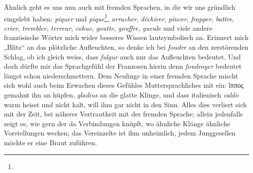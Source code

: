 {\label{fp.218}

Ähnlich geht es uns nun auch mit fremden Sprachen, in die wir uns gründlich eingelebt haben: \textit{piquer} und \textit{pique}\footnote{},  \textit{arracher}, \textit{déchirer}, \textit{pincer}, \textit{frapper}, \textit{battre}, \textit{crier}, \textit{trembler}, \textit{terreur}, \textit{cohue}, \textit{goutte}, \textit{gouffre}, \textit{gueule} und viele andere französische Wörter  mich wider besseres Wissen lautsymbolisch an. Erinnert mich „Blitz“ an das plötzliche Aufleuchten, so denke ich bei \textit{foudre} an den zerstörenden Schlag, ob ich gleich weiss, dass \textit{fulgur} auch nur das Aufleuchten bedeutet. Und doch dürfte mir das Sprachgefühl der Franzosen hierin  denn \textit{foudroyer} bedeutet längst schon niederschmettern. Dem Neulinge in einer fremden Sprache mischt sich wohl auch beim Erwachen dieses Gefühles Muttersprachliches mit ein: ἳππος gemahnt ihn an hüpfen, \textit{gladius} an die glatte Klinge, und dass italienisch \textit{caldo} warm heisst und nicht kalt, will ihm gar nicht in den  Sinn. Alles dies verliert sich mit der Zeit, bei näherer Vertrautheit mit der fremden Sprache; allein jedenfalls zeigt es, wie gern der  da Verbindungen knüpft, wo ähnliche Klänge ähnliche Vorstellungen wecken; das Vereinzelte ist ihm unheimlich, jedem Junggesellen möchte er eine Braut zuführen.

}
